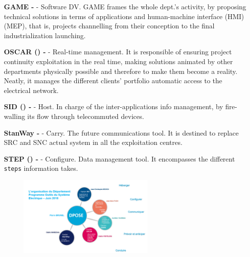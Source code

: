 \begin{description}


\item{\textbf{GAME -}  - Software DV.} GAME frames the whole dept.'s activity, by proposing technical solutions in terms of applications and human-machine interface (HMI)  (MEP), that is, projects channelling from their conception to the final industrialization launching.
 \\

\item{\textbf{OSCAR () - } - Real-time management.}   It is responsible of ensuring project continuity exploitation in the real time, making solutions animated by other departments physically possible and therefore to make them become a reality. Neatly, it manages the different clients' portfolio automatic access to the electrical network.\\

\item{\textbf{SID () - } - Host.} In charge of the inter-applications info management, by fire-walling its flow through telecommuted devices.\\

\item{\textbf{StanWay - } - Carry}. The future communications tool. It is destined to replace SRC and SNC actual system in all the exploitation centres.\\

\item{\textbf{STEP () - } - Configure.} Data management tool. It encompasses the different \texttt{steps} information takes.\\

\end{description}

\begin{figure}[h!]
    \centering
    \parbox[t]{0.6\textwidth}{
    {\includegraphics[width=0.6\textwidth]{0.figuras/DPOSE.png}}
    }
    \label{fig:DPOSE}
\end{figure}

